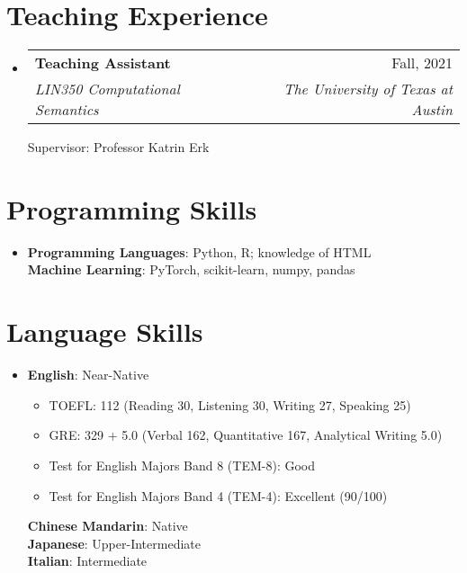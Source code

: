 \documentclass[a4paper,11pt]{article}
\makeatletter
\newcommand{\resumeItem}[1]{
  \item\small{
    {#1 \vspace{-2pt}}
  }
}
\newcommand{\resumeSubheading}[4]{
  \vspace{-2pt}
  \item
    \begin{tabular*}{0.97\textwidth}[t]{l@{\extracolsep{\fill}}r}
      \textbf{#1} & #2 \\
      \textit{\small#3} & \textit{\small #4} \\
    \end{tabular*}
    \vspace{-7pt}
}
\newcommand{\resumeSubHeadingListStart}{\begin{itemize}[leftmargin=0.15in, label={}]}
\newcommand{\resumeSubHeadingListEnd}{\end{itemize}}
\newcommand{\resumeItemListStart}{\begin{itemize}}
\newcommand{\resumeItemListEnd}{\end{itemize}\vspace{-5pt}}
\makeatother
\begin{document}
\section{Teaching Experience}
  \resumeSubHeadingListStart
    \resumeSubheading
      {Teaching Assistant}{Fall, 2021}
      {LIN350 Computational Semantics}{The University of Texas at Austin}
      \small{Supervisor: Professor Katrin Erk}
  \resumeSubHeadingListEnd

\section{Programming Skills}
 \begin{itemize}[leftmargin=0.15in, label={}]
    \item{
     \textbf{Programming Languages}{: Python, R; knowledge of HTML}\\
     \textbf{Machine Learning}{: PyTorch, scikit-learn, numpy, pandas}
     }
 \end{itemize}

\section{Language Skills}
\begin{itemize}[leftmargin=0.15in, label={}]
  \item{
   \textbf{English}{: Near-Native}\vspace{-5pt}
      \resumeItemListStart
        \resumeItem{TOEFL: 112 (Reading 30, Listening 30, Writing 27, Speaking 25)}
        \resumeItem{GRE: 329 + 5.0 (Verbal 162, Quantitative 167, Analytical Writing 5.0)}
        \resumeItem{Test for English Majors Band 8 (TEM-8): Good}
        \resumeItem{Test for English Majors Band 4 (TEM-4): Excellent (90/100)}
      \resumeItemListEnd
  \textbf{Chinese Mandarin}{: Native} \\
  \textbf{Japanese}{: Upper-Intermediate} \\
  \textbf{Italian}{: Intermediate}
   }
\end{itemize}


\end{document}
